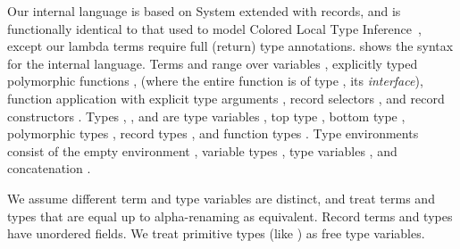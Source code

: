 Our internal language is based on System \ltiFsub extended with records, and is functionally identical
to that used to model Colored Local Type Inference~\cite{coloredlti01}, except
our lambda terms require full (return) type annotations.
 shows the syntax
for the internal language.
Terms \ltiE{} and \ltiF{} range over 
variables \ltivar{},
explicitly typed polymorphic functions
                         \ltifuntparaminterface{\ova{\ltitvar{}}}
                                               {\ltiFn{\ltiT{}}{\ltiS{}}}
                                               {\ltivar{}}
                                               {\ltiE{}},
(where the entire function is of type \ltiPoly{\ova{\ltitvar{}}}{\ltiFn{\ltiT{}}{\ltiS{}}}, its \emph{interface}),
function application
with explicit type arguments
\ltiappinst{\ltiF{}}{\ova{\ltiR{}}}{\ltiE{}},
record selectors
\ltisel{\ltiE{}}{\ltivar{}},
and record constructors
\ltiRec{\ova{\ltivar{} = \ltiE{}}}.
Types \ltiT{}, \ltiS{}, and \ltiR{} are 
type variables \ltitvar{},
top type \ltiTop,
bottom type \ltiBot,
polymorphic types \ltiPoly{\ova{\ltitvar{}}}{\ltiT{}},
record types \ltiRec{\ova{\hastype{\ltivar{}}{\ltiT{}}}},
and function types
\ltiFn{\ltiT{}}{\ltiS{}}.
Type environments \ltiEnv{}
consist of 
the empty environment
\ltiEmptyEnv,
variable types
\hastype{\ltivar{}}{\ltiT{}},
type variables 
\ltitvar{},
and concatenation
\ltiEnvConcat{\ltiEnv{}}{\ltiEnvp{}}.

We assume different term and type variables are distinct,
and treat terms and types that are equal up to alpha-renaming as equivalent.
Record terms and types have unordered fields.
We treat primitive types (like ) as free type variables.

